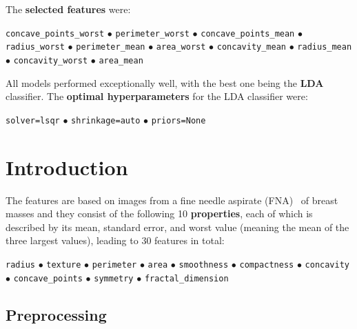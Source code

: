\documentclass[12pt]{article}
\begin{document}
The \textbf{selected features} were:
\begin{center}
    \texttt{concave\_points\_worst}
    $\bullet$ 
    \texttt{perimeter\_worst}
    $\bullet$ 
    \texttt{concave\_points\_mean}
    $\bullet$ 
    \texttt{radius\_worst}
    $\bullet$ 
    \texttt{perimeter\_mean}
    $\bullet$ 
    \texttt{area\_worst}
    $\bullet$ 
    \texttt{concavity\_mean}
    $\bullet$ 
    \texttt{radius\_mean}
    $\bullet$ 
    \texttt{concavity\_worst}
    $\bullet$ 
    \texttt{area\_mean}
\end{center}


All models performed exceptionally well, with the best one being the
\textbf{LDA} classifier. The \textbf{optimal hyperparameters} for the LDA
classifier were:
\begin{center}
    \texttt{solver=lsqr}
    $\bullet$ 
    \texttt{shrinkage=auto}
    $\bullet$ 
    \texttt{priors=None}
\end{center}



\section{Introduction}

The features are based on images from a fine needle aspirate (FNA)~\cite{Yu2012}
of breast masses and they consist of the following 10 \textbf{properties}, each
of which is described by its mean, standard error, and worst value (meaning the
mean of the three largest values), leading to 30 features in total:
\begin{center}
    \texttt{radius}
    $\bullet$ 
    \texttt{texture}
    $\bullet$ 
    \texttt{perimeter}
    $\bullet$ 
    \texttt{area}
    $\bullet$ 
    \texttt{smoothness}
    $\bullet$ 
    \texttt{compactness}
    $\bullet$ 
    \texttt{concavity}
    $\bullet$ 
    \texttt{concave\_points}
    $\bullet$ 
    \texttt{symmetry}
    $\bullet$ 
    \texttt{fractal\_dimension}    
\end{center}


\subsection{Preprocessing}
\end{document}
